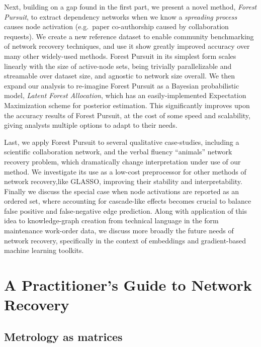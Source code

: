 \documentclass[%
	12pt,
		oneside,
		letterpaper
]{book}
\begin{document}
Next, building on a gap found in the first part, we present a novel
method, \emph{Forest Pursuit}, to extract dependency networks when we
know a \emph{spreading process} causes node activation (e.g.~paper
co-authorship caused by collaboration requests). We create a new
reference dataset to enable community benchmarking of network recovery
techniques, and use it show greatly improved accuracy over many other
widely-used methods. Forest Pursuit in its simplest form scales linearly
with the size of active-node sets, being trivially parallelizable and
streamable over dataset size, and agnostic to network size overall. We
then expand our analysis to re-imagine Forest Pursuit as a Bayesian
probabilistic model, \emph{Latent Forest Allocation}, which has an
easily-implemented Expectation Maximization scheme for posterior
estimation. This significantly improves upon the accuracy results of
Forest Pursuit, at the cost of some speed and scalability, giving
analysts multiple options to adapt to their needs.

Last, we apply Forest Pursuit to several qualitative case-studies,
including a scientific collaboration network, and the verbal fluency
``animals'' network recovery problem, which dramatically change
interpretation under use of our method. We investigate its use as a
low-cost preprocessor for other methods of network recovery,like GLASSO,
improving their stability and interpretability. Finally we discuss the
special case when node activations are reported as an ordered set, where
accounting for cascade-like effects becomes crucial to balance false
positive and false-negative edge prediction. Along with application of
this idea to knowledge-graph creation from technical language in the
form maintenance work-order data, we discuss more broadly the future
needs of network recovery, specifically in the context of embeddings and
gradient-based machine learning toolkits.

\part{A Practitioner's Guide to Network Recovery}

\chapter{Metrology as matrices}\label{metrology-as-matrices}
\end{document}
